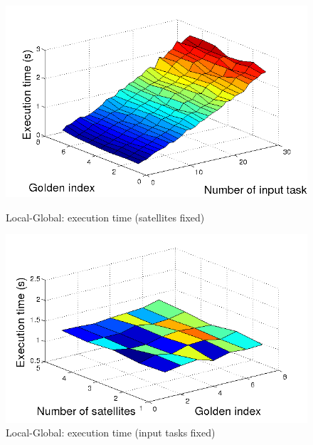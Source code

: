 \begin{figure}[h!]
  \begin{minipage}[b]{0.5\linewidth}
    \includegraphics[width=\linewidth]{Figures/tLG_satsfix.png}
    \caption{Local-Global: execution time (satellites fixed)}\label{fig_tLG_satsfix}
  \end{minipage}  
  \begin{minipage}[b]{0.5\linewidth}
    \includegraphics[width=\linewidth]{Figures/tLG_tasksfix.png}
    \caption{Local-Global: execution time (input tasks fixed)}\label{fig_tLG_tasksfix}
  \end{minipage}  
\end{figure}
